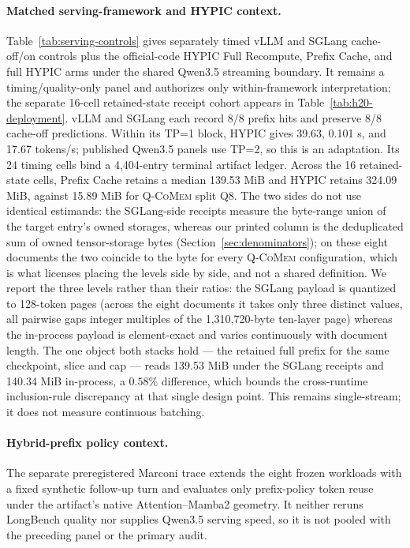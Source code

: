 \documentclass{article}
\newcommand{\qcomem}{\textsc{Q-CoMem}}
\begin{document}
\paragraph{Matched serving-framework and HYPIC context.}
Table~\ref{tab:serving-controls} gives separately timed vLLM and SGLang
cache-off/on controls plus the official-code HYPIC Full Recompute, Prefix
Cache, and full HYPIC arms under the shared Qwen3.5 streaming boundary.  It
remains a timing/quality-only panel and authorizes only within-framework
interpretation; the separate 16-cell retained-state receipt cohort appears in
Table~\ref{tab:h20-deployment}.
vLLM and SGLang each record 8/8 prefix hits and preserve 8/8 cache-off
predictions.  Within its TP=1 block, HYPIC gives 39.63, 0.101 s, and 17.67
tokens/s; published Qwen3.5 panels use TP=2, so this is an adaptation.  Its 24
timing cells bind a 4,404-entry terminal artifact ledger.  Across the
16 retained-state cells, Prefix Cache retains a median 139.53 MiB and HYPIC
retains 324.09 MiB, against 15.89 MiB for \qcomem{} split Q8.  The two sides do
not use identical estimands: the SGLang-side receipts measure the byte-range
union of the target entry's owned storages, whereas our printed column is the
deduplicated sum of owned tensor-storage bytes
(Section~\ref{sec:denominators}); on these eight documents the two coincide to
the byte for every \qcomem{} configuration, which is what licenses placing the
levels side by side, and not a shared definition.  We report the three levels
rather than their ratios: the SGLang payload is quantized to 128-token pages (across the eight
documents it takes only three distinct values, all pairwise gaps integer
multiples of the 1,310,720-byte ten-layer page) whereas the in-process payload
is element-exact and varies continuously with document length.  The one object
both stacks hold --- the retained full prefix for the same checkpoint, slice
and cap --- reads 139.53 MiB under the SGLang receipts and 140.34 MiB
in-process, a $0.58\%$ difference, which bounds the cross-runtime
inclusion-rule discrepancy at that single design point.  This remains
single-stream; it does not measure continuous batching.


\paragraph{Hybrid-prefix policy context.}
The separate preregistered Marconi trace extends the eight frozen workloads
with a fixed synthetic follow-up turn and evaluates only prefix-policy token
reuse under the artifact's native Attention--Mamba2 geometry.  It neither
reruns LongBench quality nor supplies Qwen3.5 serving speed, so it is not
pooled with the preceding panel or the primary audit.

\end{document}
